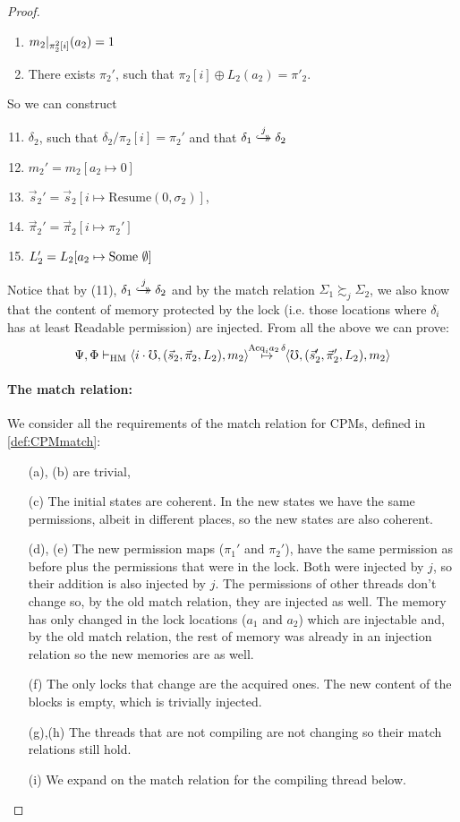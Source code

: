 \begin{proof}
\begin{enumerate}
\item $m_2 |_{\pi_2^2[i]}(a_2)=1$
\item There exists $\pi_2'$, such that $\pi_2[i] \oplus L_2(a_2) = \pi'_2$.
\end{enumerate}
So we can construct 
\begin{enumerate}
\setcounter{enumi}{10}
\item $\delta_2$, such that $\delta_2 / \pi_2[i] = \pi_2'$ and that $\delta_1 \overset{j}{\hookrightarrow\mathrel{\mspace{-15mu}}\rightarrow} \delta_2$
\item $m_2' = m_2[a_2\mapsto 0]$
\item $\vec{s}_2' = \vec{s}_2[i\mapsto \mathrm{Resume}(0,\sigma_2)] $, 
\item $\vec{\pi}_2' = \vec{\pi}_2[i\mapsto \pi_2']$
  \item $L_2' = L_2[a_2\mapsto \mathrm{Some}\ \emptyset]$
\end{enumerate}
Notice that by (11), $\delta_1 \overset{j}{\hookrightarrow\mathrel{\mspace{-15mu}}\rightarrow} \delta_2$ and by the match relation $\Sigma_1 \succsim_{j} \Sigma_2$, we also know that the content of memory protected by the lock (i.e. those locations where $\delta_i$ has at least Readable permission) are injected. From all the above we can prove:
$$\Psi,\Phi \vdash_\mathrm{HM} 
\left<i\cdot\mho, (\vec{s}_2, \vec{\pi}_2, L_2), m_2 \right>
\!\!\stackrel{\mathrm{Acq}_i a_2\, \delta}\mapsto\!\!
\left<\mho, (\vec{s}'_2, \vec{\pi}'_2, L_2), m_2 \right>$$

\paragraph{The match relation:}  We consider all the requirements of the match relation for CPMs, defined in \cref{def:CPMmatch}:
\begin{enumerate}
\item [(a), (b)] are trivial, 
\item [(c)] The initial states are coherent. In the new states we have the same permissions, albeit in different places, so the new states are also coherent.
\item [(d), (e)] The new permission maps ($\pi_1'$ and $\pi_2'$), have the same permission as before plus the permissions that were in the lock. Both were injected by $j$, so their addition is also injected by $j$. The permissions of other threads don't change so, by the old match relation, they are injected as well. The memory has only changed in the lock locations ($a_1$ and $a_2$) which are injectable and, by the old match relation, the rest of memory was already in an injection relation so the new memories are as well.
\item[(f)] The only locks that change are the acquired ones. The new content of the blocks is empty, which is trivially injected.
\item[(g),(h)] The threads that are not compiling are not changing so their match relations still hold.
\item[(i)] We expand on the match relation for the compiling thread below.


\end{enumerate}
\end{proof}
